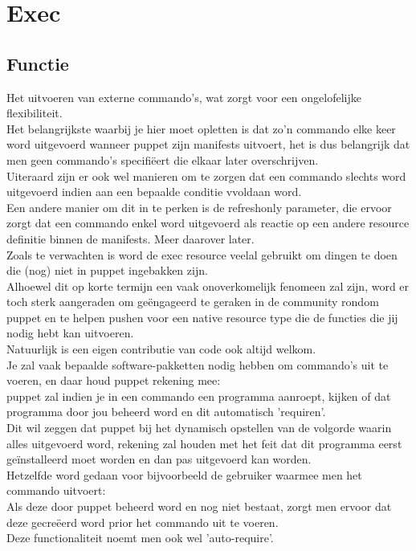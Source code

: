 \section{Exec}
\subsection{Functie}
	Het uitvoeren van externe commando's, wat zorgt voor een ongelofelijke flexibiliteit.\\
	Het belangrijkste waarbij je hier moet opletten is dat zo'n commando elke keer word uitgevoerd wanneer puppet zijn manifests uitvoert, het is dus belangrijk dat men geen commando's specifi\"{e}ert die elkaar later overschrijven.\\
	Uiteraard zijn er ook wel manieren om te zorgen dat een commando slechts word uitgevoerd indien aan een bepaalde conditie vvoldaan word.\\
	Een andere manier om dit in te perken is de refreshonly parameter, die ervoor zorgt dat een commando enkel word uitgevoerd als reactie op een andere resource definitie binnen de manifests. Meer daarover later.\\

	Zoals te verwachten is word de exec resource veelal gebruikt om dingen te doen die (nog) niet in puppet ingebakken zijn.\\
	Alhoewel dit op korte termijn een vaak onoverkomelijk fenomeen zal zijn, word er toch sterk aangeraden om ge\"{e}ngageerd te geraken in de community rondom puppet en te helpen pushen voor een native resource type die de functies die jij nodig hebt kan uitvoeren.\\
	Natuurlijk is een eigen contributie van code ook altijd welkom.\\

	Je zal vaak bepaalde software-pakketten nodig hebben om commando's uit te voeren, en daar houd puppet rekening mee:\\
	puppet zal indien je in een commando een programma aanroept, kijken of dat programma door jou beheerd word en dit automatisch 'requiren'.\\
	Dit wil zeggen dat puppet bij het dynamisch opstellen van de volgorde waarin alles uitgevoerd word, rekening zal houden met het feit dat dit programma eerst geïnstalleerd moet worden en dan pas uitgevoerd kan worden.\\
	Hetzelfde word gedaan voor bijvoorbeeld de gebruiker waarmee men het commando uitvoert:\\
	Als deze door puppet beheerd word en nog niet bestaat, zorgt men ervoor dat deze gecre\"{e}erd word prior het commando uit te voeren.\\
	Deze functionaliteit noemt men ook wel 'auto-require'.\\

